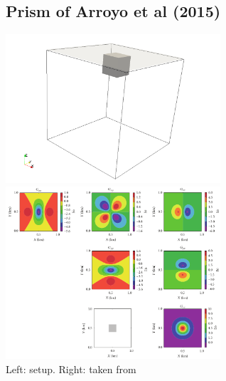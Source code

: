\newpage
\subsection*{Prism of Arroyo et al (2015)}

\begin{center}
\includegraphics[width=8cm]{python_codes/fieldstone_84/arct15/setup}
\includegraphics[width=8cm]{python_codes/fieldstone_84/arct15/arct15.png}\\
{\captionfont Left: setup. Right: taken from \cite{arct15}}
\end{center}


